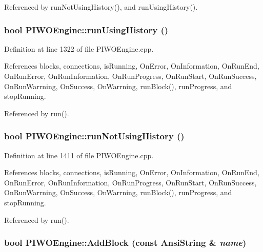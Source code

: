 Referenced by runNotUsingHistory(), and runUsingHistory().\hypertarget{classPIWOEngine_f4a1573d29015d4fa8c1a1e37df86de3}{
\subsubsection[runUsingHistory]{\setlength{\rightskip}{0pt plus 5cm}bool PIWOEngine::runUsingHistory ()}}
\label{classPIWOEngine_f4a1573d29015d4fa8c1a1e37df86de3}




Definition at line 1322 of file PIWOEngine.cpp.

References blocks, connections, isRunning, OnError, OnInformation, OnRunEnd, OnRunError, OnRunInformation, OnRunProgress, OnRunStart, OnRunSuccess, OnRunWarrning, OnSuccess, OnWarrning, runBlock(), runProgress, and stopRunning.

Referenced by run().\hypertarget{classPIWOEngine_302753a45663305fcef14a5c8c348a02}{
\subsubsection[runNotUsingHistory]{\setlength{\rightskip}{0pt plus 5cm}bool PIWOEngine::runNotUsingHistory ()}}
\label{classPIWOEngine_302753a45663305fcef14a5c8c348a02}




Definition at line 1411 of file PIWOEngine.cpp.

References blocks, connections, isRunning, OnError, OnInformation, OnRunEnd, OnRunError, OnRunInformation, OnRunProgress, OnRunStart, OnRunSuccess, OnRunWarrning, OnSuccess, OnWarrning, runBlock(), runProgress, and stopRunning.

Referenced by run().\hypertarget{classPIWOEngine_36ccc94c01c411c848b08900254caf70}{
\subsubsection[AddBlock]{\setlength{\rightskip}{0pt plus 5cm}bool PIWOEngine::AddBlock (const AnsiString \& {\em name})}}
\label{classPIWOEngine_36ccc94c01c411c848b08900254caf70}


